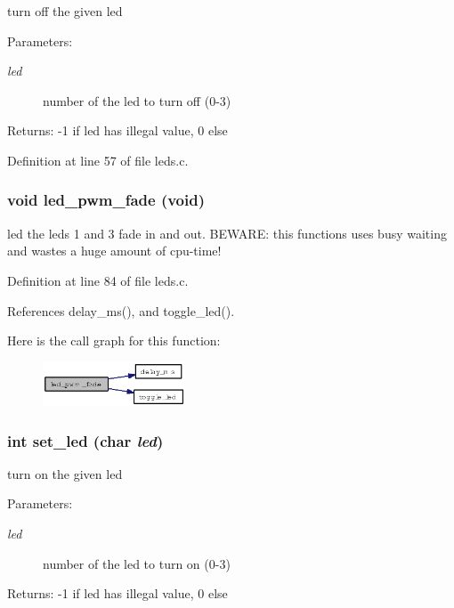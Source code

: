 turn off the given led \begin{Desc}
\item[Parameters:]
\begin{description}
\item[{\em led}]number of the led to turn off (0-3) \end{description}
\end{Desc}
\begin{Desc}
\item[Returns:]-1 if led has illegal value, 0 else \end{Desc}


Definition at line 57 of file leds.c.
\subsubsection{\setlength{\rightskip}{0pt plus 5cm}void led\_\-pwm\_\-fade (void)}\label{group__ro__leds_g06fabe845524f7bb5beec36a96e7a1bf}


led the leds 1 and 3 fade in and out. BEWARE: this functions uses busy waiting and wastes a huge amount of cpu-time! 

Definition at line 84 of file leds.c.

References delay\_\-ms(), and toggle\_\-led().

Here is the call graph for this function:\begin{figure}[H]
\begin{center}
\leavevmode
\includegraphics[width=120pt]{group__ro__leds_g06fabe845524f7bb5beec36a96e7a1bf_cgraph}
\end{center}
\end{figure}
\subsubsection{\setlength{\rightskip}{0pt plus 5cm}int set\_\-led (char {\em led})}\label{group__ro__leds_gf43daf62ed84fb33cddaf60747a82632}


turn on the given led \begin{Desc}
\item[Parameters:]
\begin{description}
\item[{\em led}]number of the led to turn on (0-3) \end{description}
\end{Desc}
\begin{Desc}
\item[Returns:]-1 if led has illegal value, 0 else \end{Desc}


